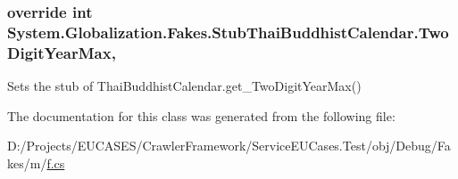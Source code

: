 \hypertarget{class_system_1_1_globalization_1_1_fakes_1_1_stub_thai_buddhist_calendar_a83e9c4e3d6c3803b1e41769383563b8b}{
\subsubsection[{Two\-Digit\-Year\-Max}]{\setlength{\rightskip}{0pt plus 5cm}override int System.\-Globalization.\-Fakes.\-Stub\-Thai\-Buddhist\-Calendar.\-Two\-Digit\-Year\-Max\hspace{0.3cm}{\ttfamily [get]}, {\ttfamily [set]}}}\label{class_system_1_1_globalization_1_1_fakes_1_1_stub_thai_buddhist_calendar_a83e9c4e3d6c3803b1e41769383563b8b}


Sets the stub of Thai\-Buddhist\-Calendar.\-get\-\_\-\-Two\-Digit\-Year\-Max()



The documentation for this class was generated from the following file\-:\begin{DoxyCompactItemize}
\item 
D\-:/\-Projects/\-E\-U\-C\-A\-S\-E\-S/\-Crawler\-Framework/\-Service\-E\-U\-Cases.\-Test/obj/\-Debug/\-Fakes/m/\hyperlink{m_2f_8cs}{f.\-cs}\end{DoxyCompactItemize}
